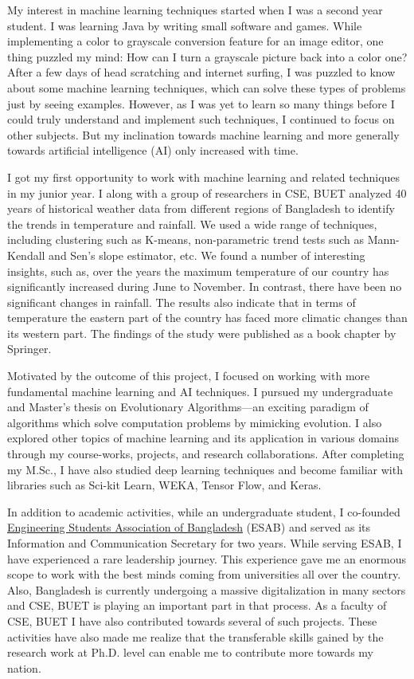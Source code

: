 \documentclass[12pt]{article}
\begin{document}
My interest in machine learning techniques started when I was a second year student. I was learning Java by writing small software and games. While implementing a color to grayscale conversion feature for an image editor, one thing puzzled my mind: How can I turn a grayscale picture back into a color one? After a few days of head scratching and internet surfing, I was puzzled to know about some machine learning techniques, which can solve these types of problems just by seeing examples. However, as I was yet to learn so many things before I could truly understand and implement such techniques, I continued to focus on other subjects. But my inclination towards machine learning and more generally towards artificial intelligence (AI) only increased with time.

I got my first opportunity to work with machine learning and related techniques in my junior year. I along with a group of researchers in CSE, BUET analyzed 40 years of historical weather data from different regions of Bangladesh to identify the trends in temperature and rainfall. We used a wide range of techniques, including clustering such as K-means, non-parametric trend tests such as Mann-Kendall and Sen's slope estimator, etc. We found a number of interesting insights, such as, over the years the maximum temperature of our country has significantly increased during June to November. In contrast, there have been no significant changes in rainfall. The results also indicate that in terms of temperature the eastern part of the country has faced more climatic changes than its western part. The findings of the study were published as a book chapter by Springer. 

Motivated by the outcome of this project, I focused on working with more fundamental machine learning and AI techniques. I pursued my undergraduate and Master's thesis on Evolutionary Algorithms---an exciting paradigm of algorithms which solve computation problems by mimicking evolution. I also explored other topics of machine learning and its application in various domains through my course-works, projects, and research collaborations. After completing my M.Sc., I have also studied deep learning techniques and become familiar with libraries such as Sci-kit Learn, WEKA, Tensor Flow, and Keras.

In addition to academic activities, while an undergraduate student, I co-founded \href{https://www.facebook.com/esab.bd}{Engineering Students Association of Bangladesh} (ESAB) and served as its Information and Communication Secretary for two years. While serving ESAB, I have experienced a rare leadership journey. This experience gave me an enormous scope to work with the best minds coming from universities all over the country. Also, Bangladesh is currently undergoing a massive digitalization in many sectors and CSE, BUET is playing an important part in that process. As a faculty of CSE, BUET I have also contributed towards several of such projects. These activities have also made me realize that the transferable skills gained by the research work at Ph.D. level can enable me to contribute more towards my nation.
\end{document}
